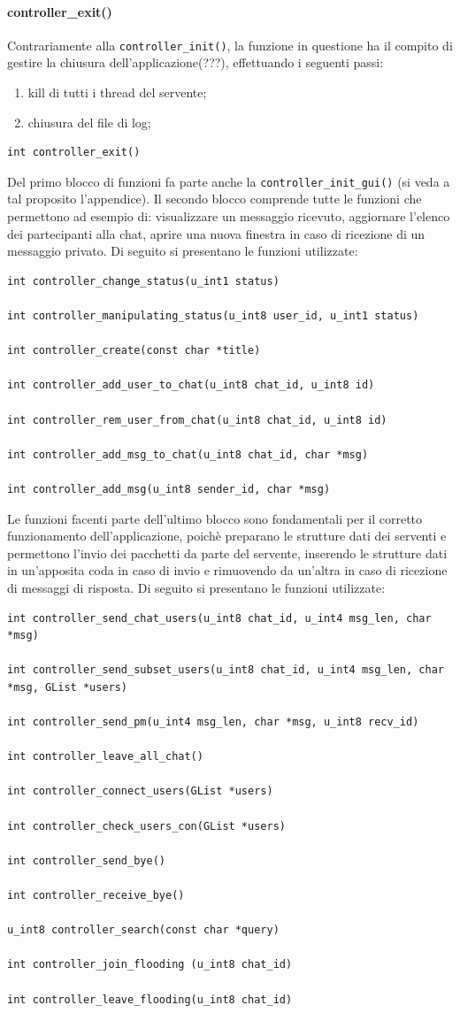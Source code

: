 \paragraph{controller\_exit()}
Contrariamente alla \texttt{controller\_init()}, la funzione in questione ha il compito di gestire la chiusura dell'applicazione(???), effettuando i seguenti passi:
\begin{enumerate}
\item kill di tutti i thread del servente;
\item chiusura del file di log;
\end{enumerate}
\begin{lstlisting}
int controller_exit()
\end{lstlisting}
Del primo blocco di funzioni fa parte anche la \texttt{controller\_init\_gui()} (si veda a tal proposito l'appendice). Il secondo blocco comprende tutte le funzioni che permettono ad esempio di: visualizzare un messaggio ricevuto, aggiornare l'elenco dei partecipanti alla chat, aprire una nuova finestra in caso di ricezione di un messaggio privato. Di seguito si presentano le funzioni utilizzate:
\begin{lstlisting}
int controller_change_status(u_int1 status)

int controller_manipulating_status(u_int8 user_id, u_int1 status)

int controller_create(const char *title)

int controller_add_user_to_chat(u_int8 chat_id, u_int8 id)

int controller_rem_user_from_chat(u_int8 chat_id, u_int8 id)

int controller_add_msg_to_chat(u_int8 chat_id, char *msg)

int controller_add_msg(u_int8 sender_id, char *msg)
\end{lstlisting}
Le funzioni facenti parte dell'ultimo blocco sono fondamentali per il corretto funzionamento dell'applicazione, poichè preparano le strutture dati dei serventi e permettono l'invio dei pacchetti da parte del servente, inserendo le strutture dati in un'apposita coda in caso di invio e rimuovendo da un'altra in caso di ricezione di messaggi di risposta.
Di seguito si presentano le funzioni utilizzate:
\begin{lstlisting}
int controller_send_chat_users(u_int8 chat_id, u_int4 msg_len, char *msg)

int controller_send_subset_users(u_int8 chat_id, u_int4 msg_len, char *msg, GList *users)

int controller_send_pm(u_int4 msg_len, char *msg, u_int8 recv_id)

int controller_leave_all_chat()

int controller_connect_users(GList *users)

int controller_check_users_con(GList *users)

int controller_send_bye()

int controller_receive_bye()

u_int8 controller_search(const char *query)

int controller_join_flooding (u_int8 chat_id)

int controller_leave_flooding(u_int8 chat_id)
\end{lstlisting}
